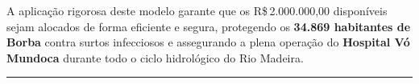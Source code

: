 \documentclass[12pt,a4paper]{article}
\begin{document}
\bigskip
A aplicação rigorosa deste modelo garante que os R\$\,2.000.000,00 disponíveis sejam alocados de forma eficiente e segura, protegendo os \textbf{34.869 habitantes de Borba} contra surtos infecciosos e assegurando a plena operação do \textbf{Hospital Vó Mundoca} durante todo o ciclo hidrológico do Rio Madeira.

\bigskip
\noindent\textcolor{navyblue!50}{\rule{\linewidth}{0.5pt}}

\end{document}
